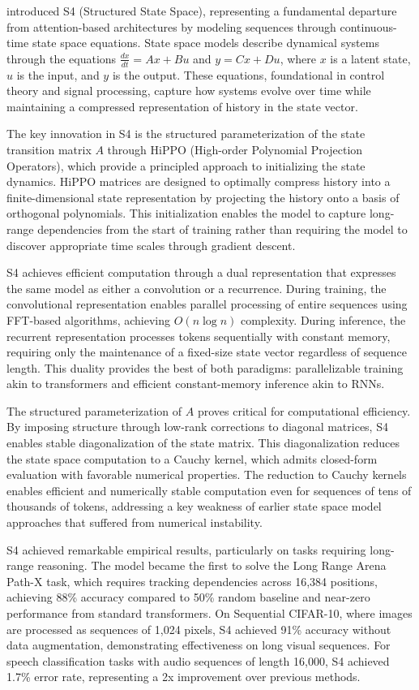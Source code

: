 \citet{gu2022efficiently} introduced S4 (Structured State Space), representing a fundamental departure from attention-based architectures by modeling sequences through continuous-time state space equations. State space models describe dynamical systems through the equations $\frac{dx}{dt} = Ax + Bu$ and $y = Cx + Du$, where $x$ is a latent state, $u$ is the input, and $y$ is the output. These equations, foundational in control theory and signal processing, capture how systems evolve over time while maintaining a compressed representation of history in the state vector.

The key innovation in S4 is the structured parameterization of the state transition matrix $A$ through HiPPO (High-order Polynomial Projection Operators), which provide a principled approach to initializing the state dynamics. HiPPO matrices are designed to optimally compress history into a finite-dimensional state representation by projecting the history onto a basis of orthogonal polynomials. This initialization enables the model to capture long-range dependencies from the start of training rather than requiring the model to discover appropriate time scales through gradient descent.

S4 achieves efficient computation through a dual representation that expresses the same model as either a convolution or a recurrence. During training, the convolutional representation enables parallel processing of entire sequences using FFT-based algorithms, achieving $O(n \log n)$ complexity. During inference, the recurrent representation processes tokens sequentially with constant memory, requiring only the maintenance of a fixed-size state vector regardless of sequence length. This duality provides the best of both paradigms: parallelizable training akin to transformers and efficient constant-memory inference akin to RNNs.

The structured parameterization of $A$ proves critical for computational efficiency. By imposing structure through low-rank corrections to diagonal matrices, S4 enables stable diagonalization of the state matrix. This diagonalization reduces the state space computation to a Cauchy kernel, which admits closed-form evaluation with favorable numerical properties. The reduction to Cauchy kernels enables efficient and numerically stable computation even for sequences of tens of thousands of tokens, addressing a key weakness of earlier state space model approaches that suffered from numerical instability.

S4 achieved remarkable empirical results, particularly on tasks requiring long-range reasoning. The model became the first to solve the Long Range Arena Path-X task, which requires tracking dependencies across 16,384 positions, achieving 88\% accuracy compared to 50\% random baseline and near-zero performance from standard transformers. On Sequential CIFAR-10, where images are processed as sequences of 1,024 pixels, S4 achieved 91\% accuracy without data augmentation, demonstrating effectiveness on long visual sequences. For speech classification tasks with audio sequences of length 16,000, S4 achieved 1.7\% error rate, representing a 2x improvement over previous methods.

